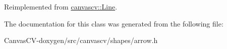 Reimplemented from \hyperlink{classcanvascv_1_1Line_a863306159fbca892702fd3d0047b63c3}{canvascv\+::\+Line}.



The documentation for this class was generated from the following file\+:\begin{DoxyCompactItemize}
\item 
Canvas\+C\+V-\/doxygen/src/canvascv/shapes/arrow.\+h\end{DoxyCompactItemize}
